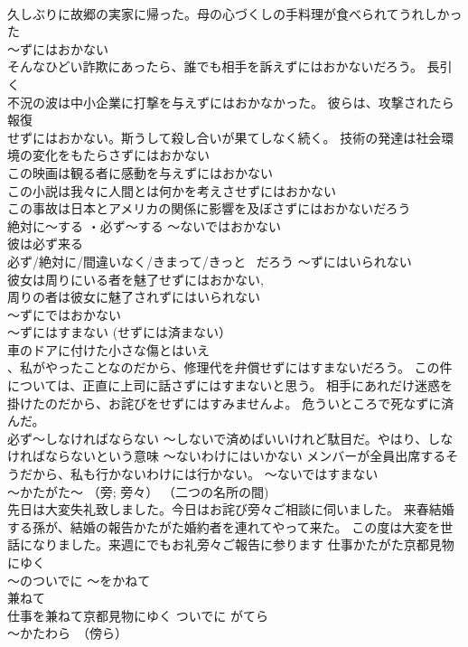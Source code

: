 \documentclass[8pt]{extreport}
\begin{document}
\begin{CJK}{UTF8}{min}
\\	久しぶりに故郷の実家に帰った。母の心づくしの手料理が食べられてうれしかった
\\	～ずにはおかない	
\\	そんなひどい詐欺にあったら、誰でも相手を訴えずにはおかないだろう。 長引く
\\	不況の波は中小企業に打撃を与えずにはおかなかった。 彼らは、攻撃されたら報復
\\	せずにはおかない。斯うして殺し合いが果てしなく続く。 技術の発達は社会環境の変化をもたらさずにはおかない 
\\	この映画は観る者に感動を与えずにはおかない 
\\	この小説は我々に人間とは何かを考えさせずにはおかない 
\\	この事故は日本とアメリカの関係に影響を及ぼさずにはおかないだろう 
\\	絶対に～する ・必ず～する ～ないではおかない 
\\	彼は必ず来る 
\\	必ず/絶対に/間違いなく/きまって/きっと~ だろう ～ずにはいられない 
\\	彼女は周りにいる者を魅了せずにはおかない, 
\\	周りの者は彼女に魅了されずにはいられない 
\\	～ずにではおかない
\\	～ずにはすまない (せずには済まない）	
\\	車のドアに付けた小さな傷とはいえ
\\	、私がやったことなのだから、修理代を弁償せずにはすまないだろう。 この件については、正直に上司に話さずにはすまないと思う。 相手にあれだけ迷惑を掛けたのだから、お詫びをせずにはすみませんよ。 危ういところで死なずに済んだ。 
\\	必ず～しなければならない ～しないで済めばいいけれど駄目だ。やはり、しなければならないという意味	～ないわけにはいかない メンバーが全員出席するそうだから、私も行かないわけには行かない。 ～ないではすまない
\\	～かたがた～ （旁; 旁々） （二つの名所の間)	
\\	先日は大変失礼致しました。今日はお詫び旁々ご相談に伺いました。 来春結婚する孫が、結婚の報告かたがた婚約者を連れてやって来た。 この度は大変を世話になりました。来週にでもお礼旁々ご報告に参ります 仕事かたがた京都見物にゆく 
\\	～のついでに ～をかねて 
\\	兼ねて 
\\	仕事を兼ねて京都見物にゆく ついでに がてら
\\	～かたわら　（傍ら）	

\end{CJK}
\end{document}
